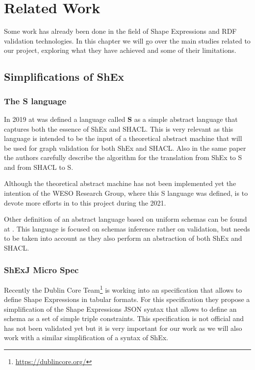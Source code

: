 \chapter{Related Work}
\label{ch:retalted-work}

Some work has already been done in the field of Shape Expressions and RDF validation
technologies. In this chapter we will go over the main studies related to our project,
exploring what they have achieved and some of their limitations.


\section{Simplifications of ShEx}
\label{sec:related-work-simplifications}

\subsection{The \textbf{S} language}

In 2019 at \cite{rdf-challenges} was defined a language called \textbf{S} as a simple abstract
language that captures both the essence of ShEx and SHACL. This is very relevant as this language
is intended to be the input of a theoretical abstract machine that will be used for graph validation
for both ShEx and SHACL. Also in the same paper the authors carefully describe the algorithm for the
translation from ShEx to S and from SHACL to S.

Although the theoretical abstract machine has not been implemented yet the intention of the WESO
Research Group, where this S language was defined, is to devote more efforts in to this project
during the 2021.

Other definition of an abstract language based on uniform schemas can be found at \cite{iovka-auto-shex-shacl}.
This language is focused on schemas inference rather on validation, but needs to be taken
into account as they also perform an abstraction of both ShEx and SHACL.

\subsection{ShExJ Micro Spec}
Recently the Dublin Core Team\footnote{\url{https://dublincore.org/}} is working into an
specification that allows to define Shape Expressions in tabular formats. For this specification
they propose a simplification of the Shape Expressions JSON syntax that allows to define an
schema as a set of simple triple constraints. This specification is not official and has
not been validated yet but it is very important for our work as we will also work with a similar
simplification of a syntax of ShEx.


